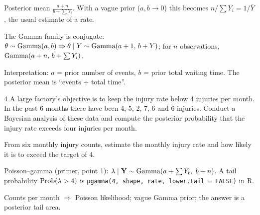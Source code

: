 \documentclass[11pt]{article}
\begin{document}
\begin{sanity}
Posterior mean $\frac{a+n}{b+\sum Y_i}$. With a vague prior ($a,b\to0$) this becomes $n/\sum Y_i=1/\bar Y$, the usual estimate of a rate. \checkmark
\end{sanity}

\begin{answer}
The Gamma family is conjugate: $\theta\sim\mathrm{Gamma}(a,b)\Rightarrow\theta\mid Y\sim\mathrm{Gamma}(a+1,\,b+Y)$; for $n$ observations, $\mathrm{Gamma}(a+n,\,b+\sum Y_i)$.
\end{answer}

\begin{takeaway}
Interpretation: $a$ = prior number of events, $b$ = prior total waiting time. The posterior mean is ``events $\div$ total time''.
\end{takeaway}


\begin{problem}{4}
A large factory's objective is to keep the injury rate below 4 injuries per month. In the past 6 months there have been 4, 5, 2, 7, 6 and 6 injuries. Conduct a Bayesian analysis of these data and compute the posterior probability that the injury rate exceeds four injuries per month.
\end{problem}

\begin{restate}
From six monthly injury counts, estimate the monthly injury rate and how likely it is to exceed the target of 4.
\end{restate}

\begin{recall}
Poisson--gamma (primer, point 1): $\lambda\mid\mathbf Y\sim\dist{Gamma}(a+\sum Y_t,\ b+n)$. A tail probability $\mathrm{Prob}(\lambda>4)$ is \texttt{pgamma(4, shape, rate, lower.tail = FALSE)} in R.
\end{recall}

\begin{keyidea}
Counts per month $\Rightarrow$ Poisson likelihood; vague Gamma prior; the answer is a posterior tail area.
\end{keyidea}
\end{document}
